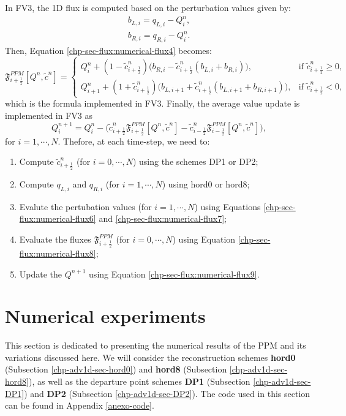 In FV3, the 1D flux is computed based on the perturbation values \citep{harris:2021} given by:
\begin{align}
\label{chp-sec-flux:numerical-flux6}
b_{L,i} = q_{L,i} - Q_i^n, \\
\label{chp-sec-flux:numerical-flux7}
b_{R,i} = q_{R,i} - Q_i^n.
\end{align}
Then, Equation \eqref{chp-sec-flux:numerical-flux4} becomes:
\begin{equation}
	\label{chp-sec-flux:numerical-flux8}
        \mathfrak{F}_{i+\frac{1}{2}}^{PPM}[Q^n,\tilde{c}^n]  =  
    	\begin{cases}
        Q_{i}^n +
        (1-\tilde{c}_{{i+\frac{1}{2}}}^n)
        \big(b_{R,i}-\tilde{c}_{{i+\frac{1}{2}}}^n
        (b_{L,i}+b_{R,i})\big),
	& \text{if } \tilde{c}_{i+\frac{1}{2}}^n \geq 0,\\
	Q_{i+1}^n +
        (1+\tilde{c}_{{i+\frac{1}{2}}}^n)
        \big(b_{L,i+1}+\tilde{c}_{{i+\frac{1}{2}}}^n
        (b_{L,i+1}+b_{R,i+1})\big),
	& \text{if } \tilde{c}_{i+\frac{1}{2}}^n<0,
    	\end{cases}
\end{equation}
which is the formula implemented in FV3.
Finally, the average value update is implemented in FV3 as
\begin{equation}
	\label{chp-sec-flux:numerical-flux9}
	Q_i^{n+1} = Q_i^{n} - 
        \big(\tilde{c}_{i+\frac{1}{2}}^n\mathfrak{F}_{i+\frac{1}{2}}^{PPM}[Q^n,\tilde{c}^n] -
        \tilde{c}_{i-\frac{1}{2}}^n\mathfrak{F}_{i-\frac{1}{2}}^{PPM}[Q^n,\tilde{c}^n]  \big),
\end{equation}
for $i=1, \cdots, N$.
Thefore, at each time-step, we need to:
\begin{enumerate}
\item Compute $\tilde{c}_{i+\frac{1}{2}}^n$ (for $i = 0, \cdots, N$) using the schemes DP1 or DP2;
\item Compute $q_{L,i}$ and  $q_{R,i}$ (for $i = 1, \cdots, N$) using hord0 or hord8;
\item Evalute the pertubation values (for $i = 1, \cdots, N$) using Equations
\eqref{chp-sec-flux:numerical-flux6} and \eqref{chp-sec-flux:numerical-flux7};
\item Evaluate the fluxes  $\mathfrak{F}_{i+\frac{1}{2}}^{PPM}$ (for $i = 0, \cdots, N$) using Equation \eqref{chp-sec-flux:numerical-flux8};
\item Update the $Q^{n+1}$ using Equation \eqref{chp-sec-flux:numerical-flux9}.
\end{enumerate}
\section{Numerical experiments}
\label{chp-adv1d-sec-numerical-exp}
This section is dedicated to presenting the numerical results of the PPM and 
its variations discussed here. We will consider the reconstruction
schemes \textbf{hord0} (Subsection \ref{chp-adv1d-sec-hord0}) and 
\textbf{hord8} (Subsection \ref{chp-adv1d-sec-hord8}), as well as the departure point schemes
\textbf{DP1} (Subsection \ref{chp-adv1d-sec-DP1}) and \textbf{DP2} (Subsection \ref{chp-adv1d-sec-DP2}).
The code used in this section can be found in Appendix \ref{anexo-code}.

